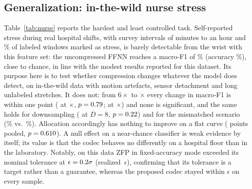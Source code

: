 \documentclass[journal]{IEEEtran}
\begin{document}
\subsection{Generalization: in-the-wild nurse stress}
\begin{table}[t]
\caption{Nurse stress (in the wild): self-reported stress vs.\ none, LOSO over \nurseNSubjects{} nurses, \nSeeds{} seeds. F1 is macro-F1; ``F1 mism.''\ is an uncompressed-trained model on reconstructed data.}
\label{tab:nurse}
\centering\scriptsize
\resizebox{\columnwidth}{!}{}
\end{table}
Table~\ref{tab:nurse} reports the hardest and least controlled task. Self-reported stress during real hospital shifts, with survey intervals of minutes to an hour and \nursePctStress\% of labeled windows marked as stress, is barely detectable from the wrist with this feature set: the uncompressed FFNN reaches a macro-F1 of \nurseRawF\% (accuracy \nurseRawAcc\%), close to chance, in line with the modest results reported for this dataset. Its purpose here is to test whether compression changes whatever the model does detect, on in-the-wild data with motion artefacts, sensor detachment and long unlabeled stretches. It does not: from $6\times$ to \nurseRatioEf$\times$ every change in macro-F1 is within one point (\nurseDFEd{} at \nurseRatioEd$\times$, $p=0.79$; \nurseDFEf{} at \nurseRatioEf$\times$) and none is significant, and the same holds for downsampling (\nurseDsDFH{} at $D=8$, $p=0.22$) and for the mismatched scenario (\nurseFMMEd\% vs.\ \nurseDsFMMH\%). Allocation accordingly has nothing to improve on a flat curve (\nurseallocPooledDiff{} points pooled, $p=0.610$). A null effect on a near-chance classifier is weak evidence by itself; its value is that the codec behaves no differently on a hospital floor than in the laboratory. Notably, on this data ZFP in fixed-accuracy mode exceeded its nominal tolerance at $\epsilon=0.2\sigma$ (realized \nurseZfpErrMax\,$\epsilon$), confirming that its tolerance is a target rather than a guarantee, whereas the proposed codec stayed within $\epsilon$ on every sample.
\end{document}
